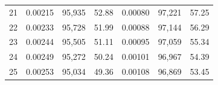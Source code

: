 \begin{tabular}{cccc|ccc}
21   & 0.00215                                                          & 95,935                                                                                            & 52.88                                                                                                                      & 0.00080                                                          & 97,221                                                                                            & 57.25                                                                                                                      \\
22   & 0.00233                                                          & 95,728                                                                                            & 51.99                                                                                                                      & 0.00088                                                          & 97,144                                                                                            & 56.29                                                                                                                      \\
23   & 0.00244                                                          & 95,505                                                                                            & 51.11                                                                                                                      & 0.00095                                                          & 97,059                                                                                            & 55.34                                                                                                                      \\
24   & 0.00249                                                          & 95,272                                                                                            & 50.24                                                                                                                      & 0.00101                                                          & 96,967                                                                                            & 54.39                                                                                                                      \\
25   & 0.00253                                                          & 95,034                                                                                            & 49.36                                                                                                                      & 0.00108                                                          & 96,869                                                                                            & 53.45                                                                                                                      \\

\end{tabular}
